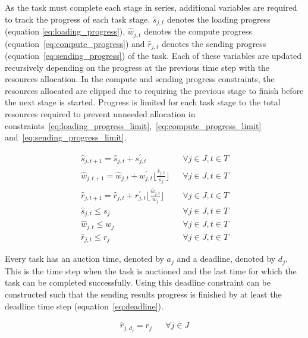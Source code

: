 As the task must complete each stage in series, additional variables are required to track the progress of
each task stage. $\hat{s}_{j,t}$ denotes the loading progress (equation \eqref{eq:loading_progress}), $\hat{w}_{j,t}$
denotes the compute progress (equation~\eqref{eq:compute_progress}) and $\hat{r}_{j,t}$ denotes the sending progress
(equation~\eqref{eq:sending_progress}) of the task. Each of these variables are updated recursively depending
on the progress at the previous time step with the resources allocation. In the compute and sending
progress constraints, the resources allocated are clipped due to requiring the previous stage to finish before the next
stage is started. Progress is limited for each task stage to the total resources required to prevent unneeded
allocation in constraints~\eqref{eq:loading_progress_limit},~\eqref{eq:compute_progress_limit}
and~\eqref{eq:sending_progress_limit}.

\begin{align}
    \hat{s}_{j,t+1} = \hat{s}_{j,t} + s^{'}_{j,t} && \forall{j \in J, t \in T } \label{eq:loading_progress} \\
    \hat{w}_{j,t+1} = \hat{w}_{j,t} + w^{'}_{j,t} \lfloor{\frac{\hat{s}_{j,t}}{s_j}}\rfloor && \forall{j \in J, t \in T } \label{eq:compute_progress} \\
    \hat{r}_{j,t+1} = \hat{r}_{j,t} + r^{'}_{j,t} \lfloor{\frac{\hat{w}_{j,t}}{w_j}}\rfloor && \forall{j \in J, t \in T } \label{eq:sending_progress} \\
    \hat{s}_{j,t} \leq s_j && \forall{j \in J, t \in T} \label{eq:loading_progress_limit} \\
    \hat{w}_{j,t} \leq w_j && \forall{j \in J, t \in T} \label{eq:compute_progress_limit} \\
    \hat{r}_{j,t} \leq r_j && \forall{j \in J, t \in T} \label{eq:sending_progress_limit}
\end{align}

Every task has an auction time, denoted by $a_j$ and a deadline, denoted by $d_j$. This is the time step when the task
is auctioned and the last time for which the task can be completed successfully. Using this deadline constraint can be
constructed such that the sending results progress is finished by at least the deadline time step
(equation~\eqref{eq:deadline}).

\begin{align}
    \hat{r}_{j, d_j} = r_j && \forall{j \in J} \label{eq:deadline}
\end{align}

